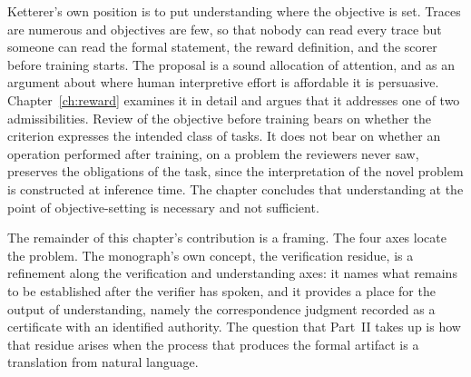 Ketterer's own position is to put understanding where the objective is set. Traces are numerous and objectives are few, so that nobody can read every trace but someone can read the formal statement, the reward definition, and the scorer before training starts. The proposal is a sound allocation of attention, and as an argument about where human interpretive effort is affordable it is persuasive. Chapter~\ref{ch:reward} examines it in detail and argues that it addresses one of two admissibilities. Review of the objective before training bears on whether the criterion expresses the intended class of tasks. It does not bear on whether an operation performed after training, on a problem the reviewers never saw, preserves the obligations of the task, since the interpretation of the novel problem is constructed at inference time. The chapter concludes that understanding at the point of objective-setting is necessary and not sufficient.

The remainder of this chapter's contribution is a framing. The four axes locate the problem. The monograph's own concept, the verification residue, is a refinement along the verification and understanding axes: it names what remains to be established after the verifier has spoken, and it provides a place for the output of understanding, namely the correspondence judgment recorded as a certificate with an identified authority. The question that Part~II takes up is how that residue arises when the process that produces the formal artifact is a translation from natural language.
